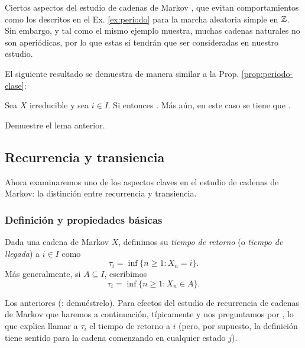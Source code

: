 Ciertos aspectos del estudio de cadenas de Markov , que evitan comportamientos como los descritos en el Ex. \ref{ex:periodo} para la marcha aleatoria simple en $\mathbb{Z}$.
Sin embargo, y tal como el mismo ejemplo muestra, muchas cadenas naturales no son aperiódicas, por lo que estas sí tendrán que ser consideradas en nuestro estudio.

El siguiente resultado se demuestra de manera similar a la Prop. \ref{prop:periodo-clase}:

\begin{lem}\label{lem:aperiod}
Sea $X$ irreducible y sea $i\in I$.
Si  entonces .
Más aún, en este caso se tiene que .
\end{lem}

\begin{exer}
Demuestre el lema anterior.
\end{exer}

\subsection{Recurrencia y transiencia}

Ahora examinaremos uno de los aspectos claves en el estudio de cadenas de Markov: la distinción entre recurrencia y transiencia.

\subsubsection{Definición y propiedades básicas}

\begin{defn}
Dada una cadena de Markov $X$, definimos su \emph{tiempo de retorno} (o \emph{tiempo de llegada}) a $i\in I$ como
\[\tau_i=\inf\{n\geq1\!:X_n=i\}.\]
Más generalmente, si $A\subseteq I$, escribimos
\[\tau_i=\inf\{n\geq1\!:X_n\in A\}.\]
\end{defn}

Los anteriores  (\uexers: demuéstrelo).
Para efectos del estudio de recurrencia de cadenas de Markov que haremos a continuación, típicamente  y nos preguntamos por , lo que explica llamar a $\tau_i$ el tiempo de retorno a $i$ (pero, por supuesto, la definición tiene sentido para la cadena comenzando en cualquier estado $j$).

